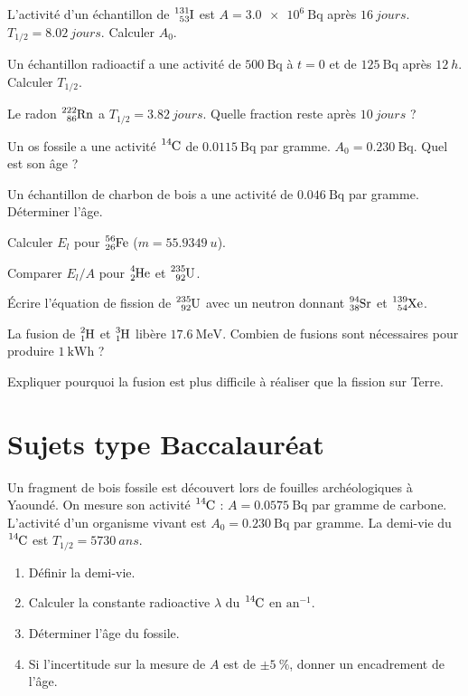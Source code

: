 \exo{} L'activité d'un échantillon de $\ce{^{131}_{53}I}$ est $A = \SI{3.0e6}{\becquerel}$ après $\SI{16}{jours}$. $T_{1/2} = \SI{8.02}{jours}$. Calculer $A_0$.

\exo{} Un échantillon radioactif a une activité de $\SI{500}{\becquerel}$ à $t=0$ et de $\SI{125}{\becquerel}$ après $\SI{12}{h}$. Calculer $T_{1/2}$.

\exo{} Le radon $\ce{^{222}_{86}Rn}$ a $T_{1/2} = \SI{3.82}{jours}$. Quelle fraction reste après $\SI{10}{jours}$ ?


\exo{} Un os fossile a une activité $\ce{^{14}C}$ de $\SI{0.0115}{\becquerel}$ par gramme. $A_0 = \SI{0.230}{\becquerel}$. Quel est son âge ?

\exo{} Un échantillon de charbon de bois a une activité de $\SI{0.046}{\becquerel}$ par gramme. Déterminer l'âge.


\exo{} Calculer $E_l$ pour $\ce{^{56}_{26}Fe}$ ($m = \SI{55.9349}{u}$).

\exo{} Comparer $E_l/A$ pour $\ce{^{4}_{2}He}$ et $\ce{^{235}_{92}U}$.


\exo{} Écrire l'équation de fission de $\ce{^{235}_{92}U}$ avec un neutron donnant $\ce{^{94}_{38}Sr}$ et $\ce{^{139}_{54}Xe}$.

\exo{} La fusion de $\ce{^{2}_{1}H}$ et $\ce{^{3}_{1}H}$ libère $\SI{17.6}{\MeV}$. Combien de fusions sont nécessaires pour produire $\SI{1}{\kilo\watt\hour}$ ?

\exo{} Expliquer pourquoi la fusion est plus difficile à réaliser que la fission sur Terre.

\section{Sujets type Baccalauréat}

Un fragment de bois fossile est découvert lors de fouilles archéologiques à Yaoundé. On mesure son activité $\ce{^{14}C}$ : $A = \SI{0.0575}{\becquerel}$ par gramme de carbone. L'activité d'un organisme vivant est $A_0 = \SI{0.230}{\becquerel}$ par gramme. La demi-vie du $\ce{^{14}C}$ est $T_{1/2} = \SI{5730}{ans}$.

\begin{enumerate}[label=\arabic*)]
    \item Définir la demi-vie.
    \item Calculer la constante radioactive $\lambda$ du $\ce{^{14}C}$ en $\mathrm{an}^{-1}$.
    \item Déterminer l'âge du fossile.
    \item Si l'incertitude sur la mesure de $A$ est de $\pm \SI{5}{\percent}$, donner un encadrement de l'âge.
\end{enumerate}

